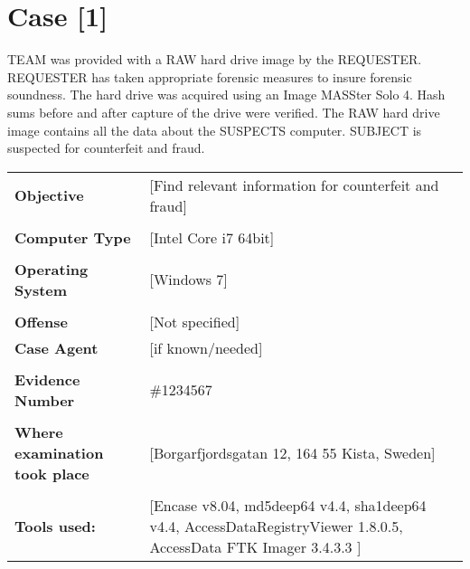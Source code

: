 \setlength\headsep{10pt}
\section{Case [1]}

TEAM was provided with a RAW hard drive image by the REQUESTER. 
REQUESTER has taken appropriate forensic measures to insure forensic soundness. The hard drive was acquired
using an Image MASSter Solo 4. Hash sums before and after capture of the drive were verified.
The RAW hard drive image contains all the data about the SUSPECTS computer.
SUBJECT is suspected for counterfeit and fraud.  


\begin{longtable}{p{}p{}}
\textbf{Objective} & [Find relevant information for counterfeit and fraud]\\
&\\
\textbf{Computer Type} & [Intel Core i7 64bit]\\
&\\
\textbf{Operating System} & [Windows 7]\\
&\\
\textbf{Offense} & [Not specified]\\
\textbf{Case Agent} & [if known/needed]\\
&\\
\textbf{Evidence Number} &  \#1234567\\
&\\
\textbf{Where examination took place} &  [Borgarfjordsgatan 12, 164 55 Kista, Sweden] \\
&\\
\textbf{Tools used:} & [Encase v8.04, md5deep64 v4.4, sha1deep64 v4.4, AccessDataRegistryViewer 1.8.0.5, AccessData FTK Imager 3.4.3.3
			]  
\end{longtable}

\newpage
